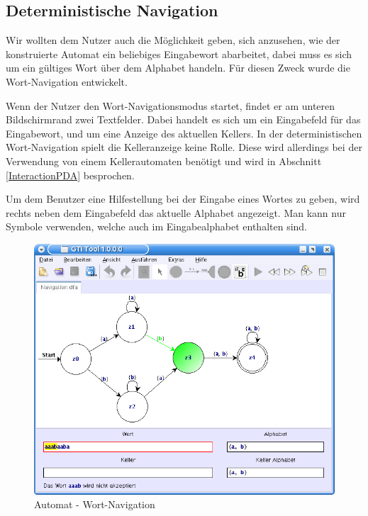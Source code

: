 \subsection{Deterministische Navigation}\label{WordNavigationDeterministic}

Wir wollten dem Nutzer auch die Möglichkeit geben, sich anzusehen, wie der
konstruierte Automat ein beliebiges Eingabewort abarbeitet, dabei muss es sich um
ein gültiges Wort über dem Alphabet handeln. Für diesen Zweck wurde die
Wort-Navigation entwickelt.\vspace{10pt}

Wenn der Nutzer den Wort-Navigationsmodus startet, findet er am unteren
Bildschirmrand zwei Textfelder. Dabei handelt es sich um ein Eingabefeld für
das Eingabewort, und um eine Anzeige des aktuellen Kellers. In der
deterministischen Wort-Navigation spielt die Kelleranzeige keine Rolle. Diese
wird allerdings bei der Verwendung von einem Kellerautomaten benötigt und wird
in Abschnitt \ref{InteractionPDA} besprochen.\vspace{10pt}

Um dem Benutzer eine Hilfestellung bei der Eingabe eines Wortes zu geben, wird
rechts neben dem Eingabefeld das aktuelle Alphabet angezeigt. Man kann nur
Symbole verwenden, welche auch im Eingabealphabet enthalten
sind.\vspace{10pt}

\begin{figure}[h]
\begin{center}
\includegraphics[width=12cm]{../images/dfa_navigation.png}
\caption{Automat - Wort-Navigation}
\end{center}
\end{figure}
\vspace{10pt}

